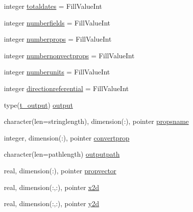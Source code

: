 \begin{DoxyCompactItemize}
\item 
integer \mbox{\hyperlink{structmodulehdf5toasciiandbin_1_1t__hdf5toasciiandbin_abf4e672dd6c32d18fdb7fef325550853}{totaldates}} = Fill\+Value\+Int
\item 
integer \mbox{\hyperlink{structmodulehdf5toasciiandbin_1_1t__hdf5toasciiandbin_a5f342782f7048b736e58600f2da36535}{numberfields}} = Fill\+Value\+Int
\item 
integer \mbox{\hyperlink{structmodulehdf5toasciiandbin_1_1t__hdf5toasciiandbin_a774979c4f565e06940e5bfa799b55d1f}{numberprops}} = Fill\+Value\+Int
\item 
integer \mbox{\hyperlink{structmodulehdf5toasciiandbin_1_1t__hdf5toasciiandbin_a8e4d5188519dc641b36d580428074486}{numbernonvectprops}} = Fill\+Value\+Int
\item 
integer \mbox{\hyperlink{structmodulehdf5toasciiandbin_1_1t__hdf5toasciiandbin_a484cdca9cc2aa98143d4b23987fe3cd8}{numberunits}} = Fill\+Value\+Int
\item 
integer \mbox{\hyperlink{structmodulehdf5toasciiandbin_1_1t__hdf5toasciiandbin_a67e4305d2451531e32c035c744dc01bb}{directionreferential}} = Fill\+Value\+Int
\item 
type(\mbox{\hyperlink{structmodulehdf5toasciiandbin_1_1t__output}{t\+\_\+output}}) \mbox{\hyperlink{structmodulehdf5toasciiandbin_1_1t__hdf5toasciiandbin_a8e6c41080664a2bb321249b7d3d33ac4}{output}}
\item 
character(len=stringlength), dimension(\+:), pointer \mbox{\hyperlink{structmodulehdf5toasciiandbin_1_1t__hdf5toasciiandbin_a71cc1bb58fcf506158c15490a528a87c}{propsname}}
\item 
integer, dimension(\+:), pointer \mbox{\hyperlink{structmodulehdf5toasciiandbin_1_1t__hdf5toasciiandbin_a7c9f1aa9b74f780f369f1300ff7a41c6}{convertprop}}
\item 
character(len=pathlength) \mbox{\hyperlink{structmodulehdf5toasciiandbin_1_1t__hdf5toasciiandbin_a8c00bae2b61c4ce86168f18676dfc92c}{outputpath}}
\item 
real, dimension(\+:), pointer \mbox{\hyperlink{structmodulehdf5toasciiandbin_1_1t__hdf5toasciiandbin_a2aa351f176b0ddc78952f476651d02d6}{propvector}}
\item 
real, dimension(\+:,\+:), pointer \mbox{\hyperlink{structmodulehdf5toasciiandbin_1_1t__hdf5toasciiandbin_a37de0cd9d865e2d8d8a32a9c4105d7af}{x2d}}
\item 
real, dimension(\+:,\+:), pointer \mbox{\hyperlink{structmodulehdf5toasciiandbin_1_1t__hdf5toasciiandbin_a61d9a3e90f2273fca149776587e09b0e}{y2d}}

\end{DoxyCompactItemize}

